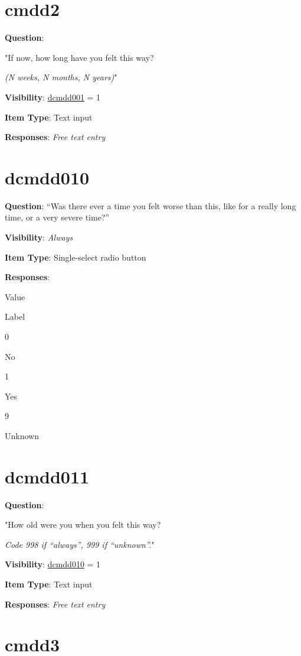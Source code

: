\documentclass[
]{book}
\begin{document}
\hypertarget{cmdd2}{%
\section{cmdd2}\label{cmdd2}}

\textbf{Question}:

"If now, how long have you felt this way?

\emph{(N weeks, N months, N years)}"

\textbf{Visibility}: \protect\hyperlink{dcmdd001}{dcmdd001} = 1

\textbf{Item Type}: Text input

\textbf{Responses}: \emph{Free text entry}

\hypertarget{dcmdd010}{%
\section{dcmdd010}\label{dcmdd010}}

\textbf{Question}: ``Was there ever a time you felt worse than this, like for a really long time, or a very severe time?''

\textbf{Visibility}: \emph{Always}

\textbf{Item Type}: Single-select radio button

\textbf{Responses}:

Value

Label

0

No

1

Yes

9

Unknown

\hypertarget{dcmdd011}{%
\section{dcmdd011}\label{dcmdd011}}

\textbf{Question}:

"How old were you when you felt this way?

\emph{Code 998 if ``always'', 999 if ``unknown''.}"

\textbf{Visibility}: \protect\hyperlink{dcmdd010}{dcmdd010} = 1

\textbf{Item Type}: Text input

\textbf{Responses}: \emph{Free text entry}

\hypertarget{cmdd3}{%
\section{cmdd3}\label{cmdd3}}
\end{document}
